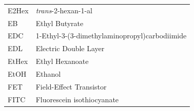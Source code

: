 \documentclass[
  a4paper,
]{scrbook}
\begin{document}
\begin{table}[H]
\begin{tabular}{@{}p{} p{}@{}}
    E2Hex  & \textit{trans}-2-hexan-1-al  \\[5pt]
    EB  & Ethyl Butyrate  \\[5pt]
    EDC  & 1-Ethyl-3-(3-dimethylaminopropyl)carbodiimide  \\[5pt]
    EDL  & Electric Double Layer  \\[5pt]
    EtHex  & Ethyl Hexanoate  \\[5pt]
    EtOH  & Ethanol  \\[5pt]
    FET  & Field-Effect Transistor  \\[5pt]
    FITC  & Fluorescein isothiocyanate  \\[5pt]
  \end{tabular}
\end{table}

\newpage
\fancyhf{} %
\thispagestyle{fancy} %
\renewcommand{\headrulewidth}{0pt}
\fancyfoot[L]{\thepage} %
\end{document}
